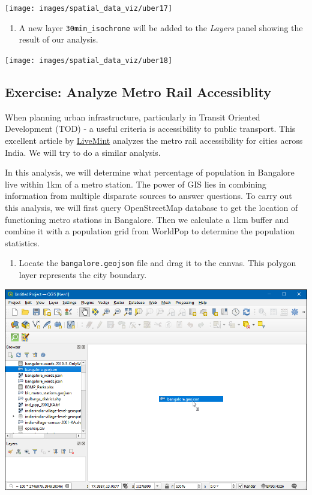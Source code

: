 \documentclass[
  12pt,
  a4paper]{article}
\providecommand{\tightlist}{%
  \setlength{\itemsep}{0pt}\setlength{\parskip}{0pt}}
\begin{document}
\begin{center}\texttt{[image: images/spatial\_data\_viz/uber17]} \end{center}

\begin{enumerate}
\def\labelenumi{\arabic{enumi}.}
\setcounter{enumi}{17}
\tightlist
\item
  A new layer \texttt{30min\_isochrone} will be added to the
  \emph{Layers} panel showing the result of our analysis.
\end{enumerate}

\begin{center}\texttt{[image: images/spatial\_data\_viz/uber18]} \end{center}

\newpage

\hypertarget{exercise-analyze-metro-rail-accessiblity}{%
\subsection{Exercise: Analyze Metro Rail
Accessiblity}\label{exercise-analyze-metro-rail-accessiblity}}

When planning urban infrastructure, particularly in Transit Oriented
Development (TOD) - a useful criteria is accessibility to public
transport. This excellent article by
\href{https://www.livemint.com/news/india/india-s-public-transport-challenge-1568355574941.html}{LiveMint}
analyzes the metro rail accessibility for cities across India. We will
try to do a similar analysis.

In this analysis, we will determine what percentage of population in
Bangalore live within 1km of a metro station. The power of GIS lies in
combining information from multiple disparate sources to answer
questions. To carry out this analysis, we will first query OpenStreetMap
database to get the location of functioning metro stations in Bangalore.
Then we calculate a 1km buffer and combine it with a population grid
from WorldPop to determine the population statistics.

\begin{enumerate}
\def\labelenumi{\arabic{enumi}.}
\tightlist
\item
  Locate the \texttt{bangalore.geojson} file and drag it to the canvas.
  This polygon layer represents the city boundary.
\end{enumerate}

\begin{center}\includegraphics[width=0.75\linewidth]{images/spatial_data_viz/pop1} \end{center}
\end{document}
